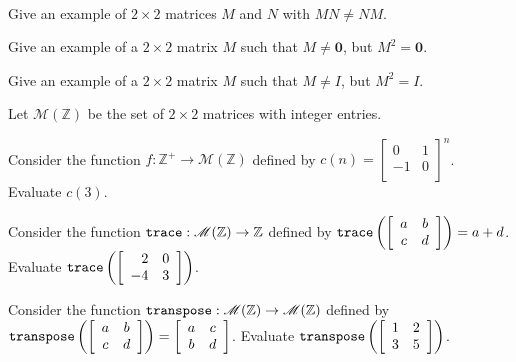 \begin{exer}[\exerU] %
\label{exer_cex_matrix}
~
    \begin{exerpart}
        \item Give an example of $2 \times 2$ matrices $M$ and $N$ with $MN \neq NM$.
        \item Give an example of a $2 \times 2$ matrix $M$ such that $M \neq \mathbf{0}$, but $M^2 = \mathbf{0}$.
        \item Give an example of a $2 \times 2$ matrix $M$ such that $M \neq I$, but $M^2 = I$.
    \end{exerpart}
 \end{exer}

\begin{exer}[\exerU] %
\label{exer_matrix_functions_harder}    
    Let $\mathscr{M}(\mathbb{Z})$ be the set of $2 \times 2$ matrices with integer entries.
        \begin{exerpart}
            \item Consider the function $f: \mathbb{Z}^+ \to \mathscr{M}(\mathbb{Z})$ defined by $c(n) = \left[ \begin{array}{cc} 0 & 1 \\ -1 & 0 \\ \end{array} \right]^n$. Evaluate $c(3)$.
            \item \label{part_trace_fn} Consider the function $\texttt{trace}: \mathscr{M}(\mathbb{Z}) \to \mathbb{Z}$ defined by $\texttt{trace} \left( \left[ \begin{array}{cc} a & b \\ c & d \\ \end{array} \right] \right) = a+d$. Evaluate $\texttt{trace}\left( \left[ \begin{array}{rr} 2 & 0 \\ -4 & 3 \\ \end{array} \right] \right)$. 
            \item \label{part_transpose_fn} Consider the function $\texttt{transpose}: \mathscr{M}(\mathbb{Z}) \to \mathscr{M}(\mathbb{Z})$ defined by $\texttt{transpose}\left( \left[ \begin{array}{cc} a & b \\ c & d \\ \end{array} \right] \right) = \left[ \begin{array}{cc} a & c \\ b & d \\ \end{array} \right]$.  Evaluate $\texttt{transpose}\left( \left[ \begin{array}{cc} 1 & 2 \\ 3 & 5 \\ \end{array} \right] \right)$.
        \end{exerpart}
\end{exer}

